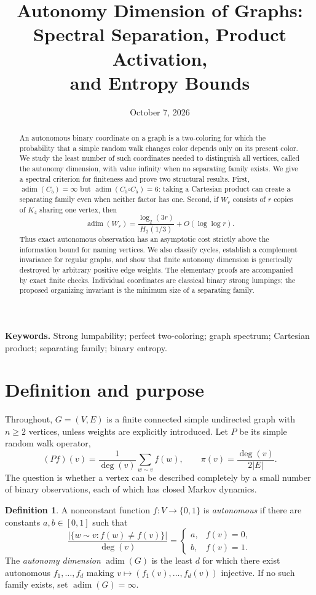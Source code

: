 \documentclass[11pt]{article}
\title{Autonomy Dimension of Graphs:\\Spectral Separation, Product Activation,\\and Entropy Bounds}
\author{}
\date{October 7, 2026}
\theoremstyle{definition}
\newtheorem{definition}[theorem]{Definition}
\newcommand{\adim}{\operatorname{adim}}
\numberwithin{equation}{section}
\begin{document}
\maketitle
\begin{abstract}
An autonomous binary coordinate on a graph is a two-coloring for which the
probability that a simple random walk changes color depends only on its
present color. We study the least number of such coordinates needed to
distinguish all vertices, called the autonomy dimension, with value infinity
when no separating family exists. We give a spectral criterion for
finiteness and prove two structural results. First,
$\adim(C_5)=\infty$ but $\adim(C_5\square C_5)=6$: taking a Cartesian
product can create a separating family even when neither factor has one.
Second, if $W_r$ consists of $r$ copies of $K_4$ sharing one vertex, then
\[
 \adim(W_r)=\frac{\log_2(3r)}{H_2(1/3)}+O(\log\log r).
\]
Thus exact autonomous observation has an asymptotic cost strictly above
the information bound for naming vertices. We also classify cycles,
establish a complement invariance for regular graphs, and show that finite
autonomy dimension is generically destroyed by arbitrary positive edge
weights. The elementary proofs are accompanied by exact finite checks.
Individual coordinates are classical binary strong lumpings; the proposed
organizing invariant is the minimum size of a separating family.
\end{abstract}

\noindent\textbf{Keywords.} Strong lumpability; perfect two-coloring;
graph spectrum; Cartesian product; separating family; binary entropy.

\section{Definition and purpose}

Throughout, $G=(V,E)$ is a finite connected simple undirected graph with
$n\geq2$ vertices, unless weights are explicitly introduced. Let $P$ be its
simple random walk operator,
\[
 (Pf)(v)=\frac{1}{\deg(v)}\sum_{w\sim v}f(w),
 \qquad \pi(v)=\frac{\deg(v)}{2|E|}.
\]
The question is whether a vertex can be described completely by a small
number of binary observations, each of which has closed Markov dynamics.

\begin{definition}\label{def:autonomy}
A nonconstant function $f:V\to\{0,1\}$ is \emph{autonomous} if there are
constants $a,b\in[0,1]$ such that
\[
 \frac{|\{w\sim v:f(w)\ne f(v)\}|}{\deg(v)}
 =\begin{cases}a,&f(v)=0,\\ b,&f(v)=1.\end{cases}
\]
The \emph{autonomy dimension} $\adim(G)$ is the least $d$ for which there
exist autonomous $f_1,\ldots,f_d$ making
$v\mapsto(f_1(v),\ldots,f_d(v))$ injective. If no such family exists,
set $\adim(G)=\infty$.
\end{definition}
\end{document}
